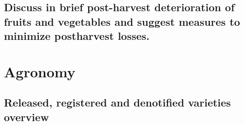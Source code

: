 \documentclass[
  openany]{book}
\begin{document}
\hypertarget{discuss-in-brief-post-harvest-deterioration-of-fruits-and-vegetables-and-suggest-measures-to-minimize-postharvest-losses.}{%
\section{Discuss in brief post-harvest deterioration of fruits and vegetables and suggest measures to minimize postharvest losses.}\label{discuss-in-brief-post-harvest-deterioration-of-fruits-and-vegetables-and-suggest-measures-to-minimize-postharvest-losses.}}

\hypertarget{agronomy}{%
\chapter{Agronomy}\label{agronomy}}

\hypertarget{released-registered-and-denotified-varieties-overview}{%
\section{Released, registered and denotified varieties overview}\label{released-registered-and-denotified-varieties-overview}}
\end{document}
